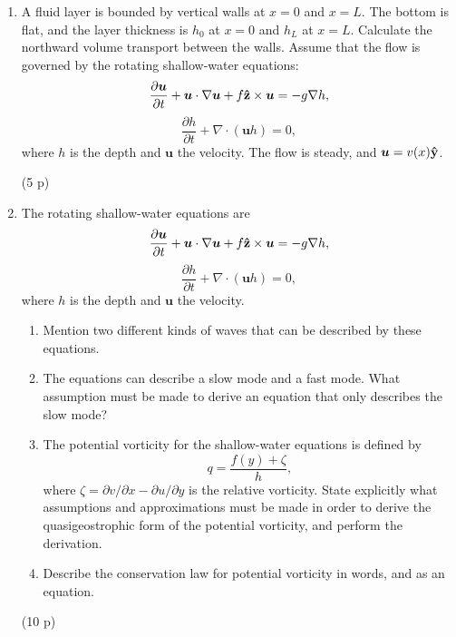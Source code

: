\documentclass[12pt,a4paper]{article}
\newcommand{\bu}{\bm{u}}
\newcommand{\hy}{{\bf\hat{y}}}
\newcommand{\hz}{{\bf\hat{z}}}
\begin{document}
\begin{enumerate}
(10 p)\\
\item
A fluid layer  is bounded by vertical walls at $x = 0$ and $x = L$. The bottom is flat, and the 
layer thickness is $h_{0}$ at $x = 0$ and $h_{L}$ at $x = L$. Calculate the northward 
volume transport between the walls. Assume that the flow is governed by the rotating 
shallow-water equations:
$$
\frac{\partial \bu}{\partial t}+\bu\cdot\nabla\bu+f\hz\times\bu
= -g\nabla h,
$$
$$
\frac{\partial h}{\partial t}+\nabla\cdot(\bu h) = 0,
$$
where $h$ is the depth and $\bu$ the velocity. The flow is steady, and $\bu = v(x)\hy$.

(5 p)\\
\item 
The rotating shallow-water equations are
$$
\frac{\partial \bu}{\partial t}+\bu\cdot\nabla\bu+f\hz\times\bu
= -g\nabla h,
$$
$$
\frac{\partial h}{\partial t}+\nabla\cdot(\bu h) = 0,
$$
where $h$ is the  depth and $\bu$ the velocity. 
\begin{enumerate}
\item Mention two different kinds of waves that can be described by these equations.
\item The equations can describe a slow mode and a fast mode. What assumption
must be made to derive an equation that only describes the slow mode?
\item The potential vorticity for the shallow-water equations is defined by
$$
q = \frac{f(y)+\zeta}{h},
$$
where $\zeta=\partial v/\partial x-\partial u/\partial y$ is the relative vorticity. State
explicitly what assumptions and approximations must be made in order to derive the 
quasigeostrophic form of the potential vorticity, and perform the derivation.
\item Describe the conservation law for potential vorticity in words, and as an equation.
\end{enumerate}

(10 p)\\
\end{enumerate}
\end{document}
